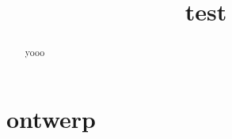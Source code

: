 \documentclass[]{article}
\title{test}
\author{}
\begin{document}
\maketitle

\begin{abstract}
yooo

\end{abstract}

\section{ontwerp}
\end{document}
